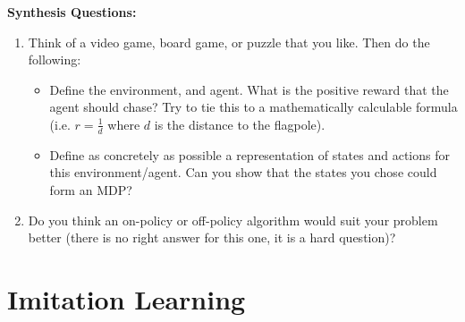 \begin{questionbox}
\textbf{Synthesis Questions:}
\begin{enumerate}
    \item Think of a video game, board game, or puzzle that you like. Then do the following:
    \begin{itemize}
        \item Define the environment, and agent. What is the positive reward that the agent should chase? Try to tie this to a mathematically calculable formula (i.e. $r = \frac{1}{d}$ where $d$ is the distance to the flagpole).
        \item Define as concretely as possible a representation of states and actions for this environment/agent. Can you show that the states you chose could form an MDP?
    \end{itemize}
    \item Do you think an on-policy or off-policy algorithm would suit your problem better (there is no right answer for this one, it is a hard question)?
\end{enumerate}
\end{questionbox}


\section{Imitation Learning}
